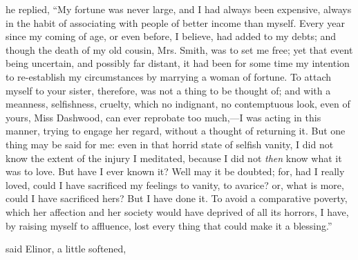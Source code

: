  he replied, “My fortune was never large, and I had always been expensive, always in the habit of associating with people of better income than myself. Every year since my coming of age, or even before, I believe, had added to my debts; and though the death of my old cousin, Mrs. Smith, was to set me free; yet that event being uncertain, and possibly far distant, it had been for some time my intention to re-establish my circumstances by marrying a woman of fortune. To attach myself to your sister, therefore, was not a thing to be thought of; and with a meanness, selfishness, cruelty, which no indignant, no contemptuous look, even of yours, Miss Dashwood, can ever reprobate too much,---I was acting in this manner, trying to engage her regard, without a thought of returning it. But one thing may be said for me: even in that horrid state of selfish vanity, I did not know the extent of the injury I meditated, because I did not {\em then} know what it was to love. But have I ever known it? Well may it be doubted; for, had I really loved, could I have sacrificed my feelings to vanity, to avarice? or, what is more, could I have sacrificed hers? But I have done it. To avoid a comparative poverty, which her affection and her society would have deprived of all its horrors, I have, by raising myself to affluence, lost every thing that could make it a blessing.”

 said Elinor, a little softened, 

